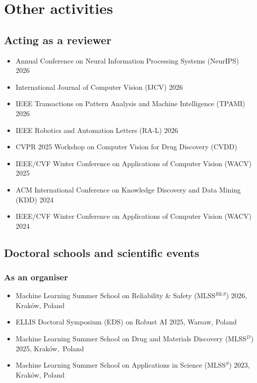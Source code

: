 \endgroup

\section{Other activities}

\subsection{Acting as a reviewer}
\begin{itemize}
    \item {Annual Conference on Neural Information Processing Systems (NeurIPS) 2026}
    \item {International Journal of Computer Vision (IJCV) 2026}
    \item {IEEE Transactions on Pattern Analysis and Machine Intelligence (TPAMI) 2026}
    \item {IEEE Robotics and Automation Letters (RA-L) 2026}
    \item {CVPR 2025 Workshop on Computer Vision for Drug Discovery (CVDD)}
    \item {IEEE/CVF Winter Conference on Applications of Computer Vision (WACV) 2025}
    \item {ACM International Conference on Knowledge Discovery and Data Mining (KDD) 2024}
    \item {IEEE/CVF Winter Conference on Applications of Computer Vision (WACV) 2024}
\end{itemize}

\subsection{Doctoral schools and scientific events}
\subsubsection{As an organiser}
\begin{itemize}[before=\raggedright]
    \item Machine Learning Summer School on Reliability \& Safety (MLSS$^{R\&S}$) 2026, Kraków, Poland
    \item ELLIS Doctoral Symposium (EDS) on Robust AI 2025, Warsaw, Poland
    \item Machine Learning Summer School on Drug and Materials Discovery (MLSS$^{D}$) 2025, Kraków,~Poland
    \item Machine Learning Summer School on Applications in Science (MLSS$^{S}$) 2023, Kraków, Poland
\end{itemize}


